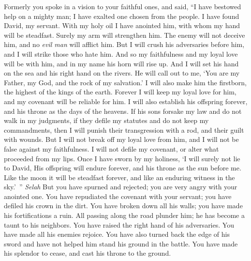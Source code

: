 \begin{biblechapter}
\verse Formerly you spoke in a vision 
to your faithful ones, and said, 
“I have bestowed help on a mighty man; 
I have exalted one chosen from the people.
\verse I have found David, my servant. 
With my holy oil I have anointed him,
\verse with whom my hand will be steadfast. 
Surely my arm will strengthen him.
\verse The enemy will not deceive him, 
and no \textit{evil man} will afflict him.
\verse But I will crush his adversaries before him, 
and I will strike those who hate him.
\verse And so my faithfulness 
and my loyal love will be with him, 
and in my name his horn will rise up.
\verse And I will set his hand on the sea 
and his right hand on the rivers.
\verse He will call out to me, ‘You are my Father, 
my God, and the rock of my salvation.’
\verse I will also make him the firstborn, 
the highest of the kings of the earth.
\verse Forever I will keep my loyal love for him, 
and my covenant will be reliable for him.
\verse I will also establish his offspring forever, 
and his throne as the days of the heavens.
\verse If his sons forsake my law 
and do not walk in my judgments,
\verse if they defile my statutes 
and do not keep my commandments,
\verse then I will punish their transgression with a rod, 
and their guilt with wounds.
\verse But I will not break off my loyal love from him, 
and I will not be false against my faithfulness.
\verse I will not defile my covenant, 
or alter what proceeded from my lips.
\verse Once I have sworn by my holiness, 
‘I will surely not lie to David,
\verse His offspring will endure forever, 
and his throne as the sun before me.
\verse Like the moon it will be steadfast forever, 
and like an enduring witness in the sky.’ ” \textit{Selah}
\verse But you have spurned and rejected; 
you are very angry with your anointed one.
\verse You have repudiated the covenant with your servant; 
you have defiled his crown in the dirt.
\verse You have broken down all his walls; 
you have made his fortifications a ruin.
\verse All passing along the road plunder him; 
he has become a taunt to his neighbors.
\verse You have raised the right hand of his adversaries. 
You have made all his enemies rejoice.
\verse You have also turned back the edge of his sword 
and have not helped him stand his ground in the battle.
\verse You have made his splendor to cease, 
and cast his throne to the ground.

\end{biblechapter}
